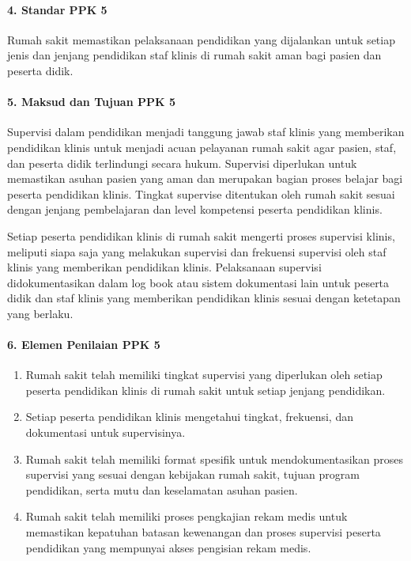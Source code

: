 \documentclass[
]{book}
\providecommand{\tightlist}{%
  \setlength{\itemsep}{0pt}\setlength{\parskip}{0pt}}
\begin{document}
\hypertarget{standar-ppk-5}{%
\paragraph*{4. Standar PPK 5}\label{standar-ppk-5}}

Rumah sakit memastikan pelaksanaan pendidikan yang dijalankan untuk setiap jenis dan jenjang pendidikan staf klinis di rumah sakit aman bagi pasien dan peserta didik.

\hypertarget{maksud-dan-tujuan-ppk-5}{%
\paragraph*{5. Maksud dan Tujuan PPK 5}\label{maksud-dan-tujuan-ppk-5}}

Supervisi dalam pendidikan menjadi tanggung jawab staf klinis yang memberikan pendidikan klinis untuk menjadi acuan pelayanan rumah sakit agar pasien, staf, dan peserta didik terlindungi secara hukum. Supervisi diperlukan untuk memastikan asuhan pasien yang aman dan merupakan bagian proses belajar bagi peserta pendidikan klinis. Tingkat supervise ditentukan oleh rumah sakit sesuai dengan jenjang pembelajaran dan level kompetensi peserta pendidikan klinis.

Setiap peserta pendidikan klinis di rumah sakit mengerti proses supervisi klinis, meliputi siapa saja yang melakukan supervisi dan frekuensi supervisi oleh staf klinis yang memberikan pendidikan klinis. Pelaksanaan supervisi didokumentasikan dalam log book atau sistem dokumentasi lain untuk peserta didik dan staf klinis yang memberikan pendidikan klinis sesuai dengan ketetapan yang berlaku.

\hypertarget{elemen-penilaian-ppk-5}{%
\paragraph*{6. Elemen Penilaian PPK 5}\label{elemen-penilaian-ppk-5}}

\begin{enumerate}
\def\labelenumi{\alph{enumi}.}
\tightlist
\item
  Rumah sakit telah memiliki tingkat supervisi yang diperlukan oleh setiap peserta pendidikan klinis di rumah sakit untuk setiap jenjang pendidikan.
\item
  Setiap peserta pendidikan klinis mengetahui tingkat, frekuensi, dan dokumentasi untuk supervisinya.
\item
  Rumah sakit telah memiliki format spesifik untuk mendokumentasikan proses supervisi yang sesuai dengan kebijakan rumah sakit, tujuan program pendidikan, serta mutu dan keselamatan asuhan pasien.
\item
  Rumah sakit telah memiliki proses pengkajian rekam medis untuk memastikan kepatuhan batasan kewenangan dan proses supervisi peserta pendidikan yang mempunyai akses pengisian rekam medis.
\end{enumerate}
\end{document}
